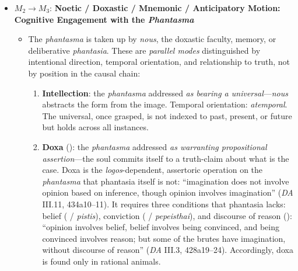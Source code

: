 \begin{itemize}
\begin{itemize}
          \item $M_2 \rightarrow M_3$: \textbf{Noetic / Doxastic / Mnemonic / Anticipatory
          Motion: Cognitive Engagement with the \textit{Phantasma}}
          \begin{itemize}
              \item The \textit{phantasma} is taken up by \textit{nous}, the doxastic
              faculty, memory, or deliberative \textit{phantasia}. These are
              \textit{parallel modes} distinguished by intentional direction,
              temporal orientation, and relationship to truth, not by position in the
              causal chain:
              \begin{enumerate}
                  \item \textbf{Intellection}: the \textit{phantasma} addressed
                  \textit{as bearing a universal}---\textit{nous} abstracts the form
                  from the image. Temporal orientation: \textit{atemporal}. The
                  universal, once grasped, is not indexed to past, present, or
                  future but holds across all instances.

                  \item \textbf{Doxa} (): the \textit{phantasma} addressed
                  \textit{as warranting propositional assertion}---the soul commits
                  itself to a truth-claim about what is the case. Doxa is the
                  \textit{logos}-dependent, assertoric operation on the
                  \textit{phantasma} that phantasia itself is not: ``imagination does
                  not involve opinion based on inference, though opinion involves
                  imagination'' (\textit{DA} III.11, 434a10--11). It requires three
                  conditions that phantasia lacks: belief ( /
                  \textit{pistis}), conviction ( /
                  \textit{pepeisthai}), and discourse of reason (): ``opinion
                  involves belief, belief involves being convinced, and being
                  convinced involves reason; but some of the brutes have
                  imagination, without discourse of reason'' (\textit{DA} III.3,
                  428a19--24). Accordingly, doxa is found only in rational animals.


\end{enumerate}
\end{itemize}
\end{itemize}
\end{itemize}

